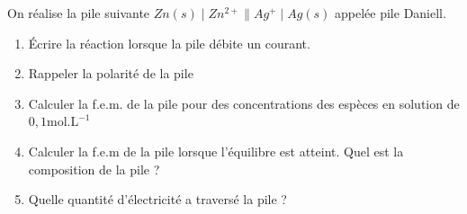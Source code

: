     On réalise la pile suivante $Zn(s)\mid Zn^{2+}\|Ag^+\mid Ag(s)$ appelée pile Daniell. 
    \begin{enumerate}
        \item Écrire la réaction lorsque la pile débite un courant.

        \nobefore\yesafter
        \yesbefore
        
        \item Rappeler la polarité de la pile 


        \item Calculer la f.e.m. de la pile pour des concentrations des espèces en solution de $0,1\text{mol.L}^{-1}$ 

        \nobefore\yesafter 
        \yesbefore 
        
        \item Calculer la f.e.m de la pile lorsque l'équilibre est atteint. Quel est la composition de la pile ?

        \item Quelle quantité d'électricité a traversé la pile ?
    \end{enumerate}